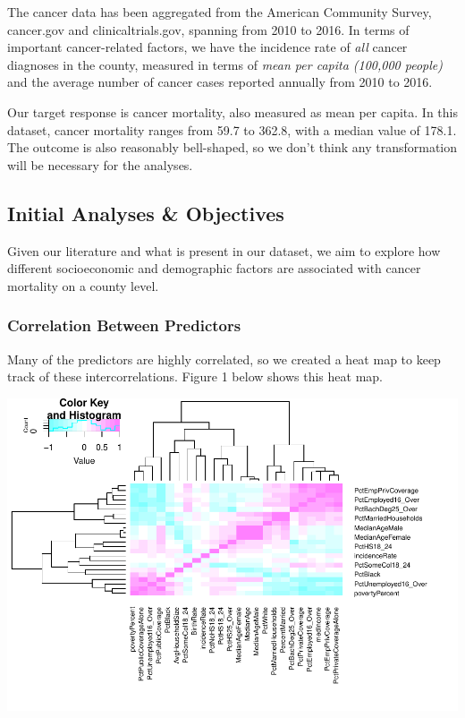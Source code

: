 \documentclass[
  11pt,
]{article}
\begin{document}
The cancer data has been aggregated from the American Community Survey,
cancer.gov and clinicaltrials.gov, spanning from 2010 to 2016. In terms
of important cancer-related factors, we have the incidence rate of
\emph{all} cancer diagnoses in the county, measured in terms of
\emph{mean per capita (100,000 people)} and the average number of cancer
cases reported annually from 2010 to 2016.

Our target response is cancer mortality, also measured as mean per
capita. In this dataset, cancer mortality ranges from 59.7 to 362.8,
with a median value of 178.1. The outcome is also reasonably
bell-shaped, so we don't think any transformation will be necessary for
the analyses.

\hypertarget{initial-analyses-objectives}{%
\subsection{Initial Analyses \&
Objectives}\label{initial-analyses-objectives}}

Given our literature and what is present in our dataset, we aim to
explore how different socioeconomic and demographic factors are
associated with cancer mortality on a county level.

\hypertarget{correlation-between-predictors}{%
\subsubsection{Correlation Between
Predictors}\label{correlation-between-predictors}}

Many of the predictors are highly correlated, so we created a heat map
to keep track of these intercorrelations. Figure 1 below shows this heat
map.

\begin{center}\includegraphics[width=0.7\linewidth]{report_files/figure-latex/unnamed-chunk-2-1} \end{center}
\end{document}
